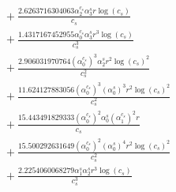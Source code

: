 \documentclass[10pt]{article}
\begin{document}
\begin{align*}
&{}  + \frac{2.6263716304063 \alpha_{2}^{c_s} \alpha_{3}^s r \log{\left(c_{s} \right)}}{c_{s}} \\
&{}  + \frac{1.4317167452955 \alpha_{0}^{c_s} \alpha_{3}^s r^{3} \log{\left(c_{s} \right)}}{c_{s}^{3}} \\
&{}  + \frac{2.906031970764 \left(\alpha_{0}^{c_s}\right)^{3} \alpha_{2}^s r^{2} \log{\left(c_{s} \right)}^{2}}{c_{s}^{2}} \\
&{}  + \frac{11.624127883056 \left(\alpha_{0}^{c_s}\right)^{3} \left(\alpha_{0}^s\right)^{3} r^{2} \log{\left(c_{s} \right)}^{2}}{c_{s}^{2}} \\
&{}  + \frac{15.443491829333 \left(\alpha_{0}^{c_s}\right)^{2} \alpha_{0}^s \left(\alpha_{1}^{c_s}\right)^{2} r}{c_{s}} \\
&{}  + \frac{15.500292631649 \left(\alpha_{0}^{c_s}\right)^{2} \left(\alpha_{0}^s\right)^{4} r^{2} \log{\left(c_{s} \right)}^{2}}{c_{s}^{2}} \\
&{}  + \frac{2.2254060068279 \alpha_{1}^s \alpha_{2}^s r^{3} \log{\left(c_{s} \right)}}{c_{s}^{3}}
\end{align*}
\end{document}
